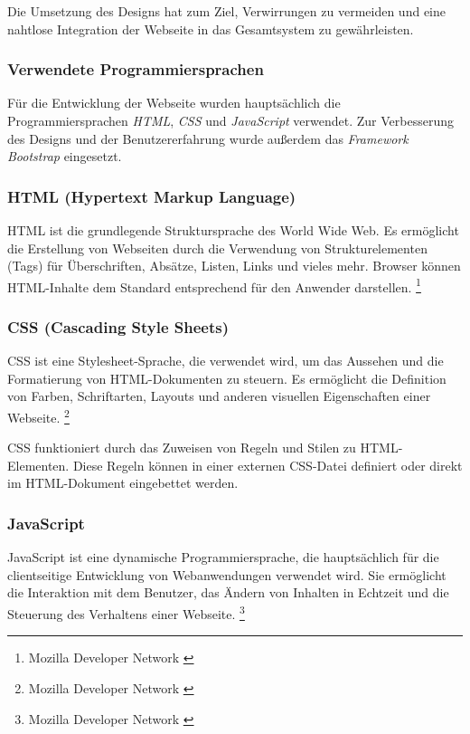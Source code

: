 Die Umsetzung des Designs hat zum Ziel, Verwirrungen zu vermeiden und eine nahtlose Integration der Webseite in das Gesamtsystem zu gewährleisten.

\subsubsection{Verwendete Programmiersprachen}
Für die Entwicklung der Webseite wurden hauptsächlich die Programmiersprachen \textit{HTML}, \textit{CSS} und \textit{JavaScript} verwendet. Zur Verbesserung des Designs und der Benutzererfahrung wurde außerdem das \textit{Framework Bootstrap} eingesetzt.

\subsubsection*{HTML (Hypertext Markup Language)}
HTML ist die grundlegende Struktursprache des World Wide Web. Es ermöglicht die Erstellung von Webseiten durch die Verwendung von Strukturelementen (Tags) für Überschriften, Absätze, Listen, Links und vieles mehr. Browser können HTML-Inhalte dem Standard entsprechend für den Anwender darstellen.
\footnote{Mozilla Developer Network \cite{HTML}}

\subsubsection*{CSS (Cascading Style Sheets)}
CSS ist eine Stylesheet-Sprache, die verwendet wird, um das Aussehen und die Formatierung von HTML-Dokumenten zu steuern. Es ermöglicht die Definition von Farben, Schriftarten, Layouts und anderen visuellen Eigenschaften einer Webseite. \footnote{Mozilla Developer Network \cite{CSS}}

CSS funktioniert durch das Zuweisen von Regeln und Stilen zu HTML-Elementen. Diese Regeln können in einer externen CSS-Datei definiert oder direkt im HTML-Dokument eingebettet werden.

\subsubsection*{JavaScript}
JavaScript ist eine dynamische Programmiersprache, die hauptsächlich für die clientseitige Entwicklung von Webanwendungen verwendet wird. Sie ermöglicht die Interaktion mit dem Benutzer, das Ändern von Inhalten in Echtzeit und die Steuerung des Verhaltens einer Webseite. \footnote{Mozilla Developer Network \cite{Javascript}}

